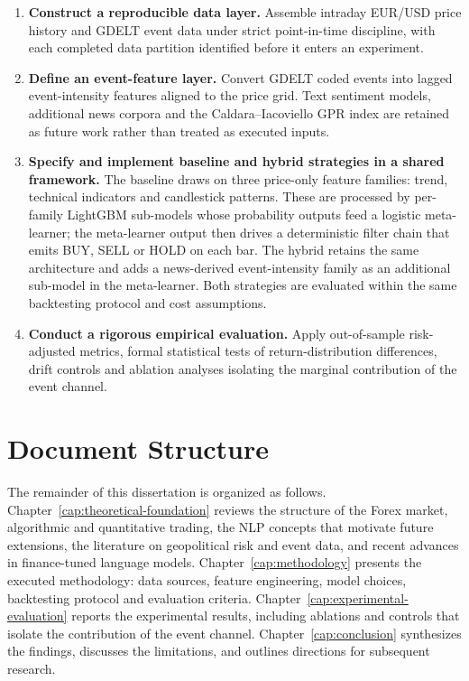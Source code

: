 \begin{enumerate}
    \item \textbf{Construct a reproducible data layer.} Assemble intraday EUR/USD price history and GDELT event data \cite{leetaru2013gdelt} under strict point-in-time discipline, with each completed data partition identified before it enters an experiment.

    \item \textbf{Define an event-feature layer.} Convert GDELT coded events into lagged event-intensity features aligned to the price grid. Text sentiment models, additional news corpora and the Caldara--Iacoviello GPR index \cite{caldara2022geopolitical} are retained as future work rather than treated as executed inputs.

    \item \textbf{Specify and implement baseline and hybrid strategies in a shared framework.} The baseline draws on three price-only feature families: trend, technical indicators and candlestick patterns. These are processed by per-family LightGBM sub-models whose probability outputs feed a logistic meta-learner; the meta-learner output then drives a deterministic filter chain that emits BUY, SELL or HOLD on each bar. The hybrid retains the same architecture and adds a news-derived event-intensity family as an additional sub-model in the meta-learner. Both strategies are evaluated within the same backtesting protocol and cost assumptions.

    \item \textbf{Conduct a rigorous empirical evaluation.} Apply out-of-sample risk-adjusted metrics, formal statistical tests of return-distribution differences, drift controls and ablation analyses isolating the marginal contribution of the event channel.
\end{enumerate}

\section{Document Structure} \label{sec:structure}

The remainder of this dissertation is organized as follows. Chapter~\ref{cap:theoretical-foundation} reviews the structure of the Forex market, algorithmic and quantitative trading, the NLP concepts that motivate future extensions, the literature on geopolitical risk and event data, and recent advances in finance-tuned language models. Chapter~\ref{cap:methodology} presents the executed methodology: data sources, feature engineering, model choices, backtesting protocol and evaluation criteria. Chapter~\ref{cap:experimental-evaluation} reports the experimental results, including ablations and controls that isolate the contribution of the event channel. Chapter~\ref{cap:conclusion} synthesizes the findings, discusses the limitations, and outlines directions for subsequent research.

